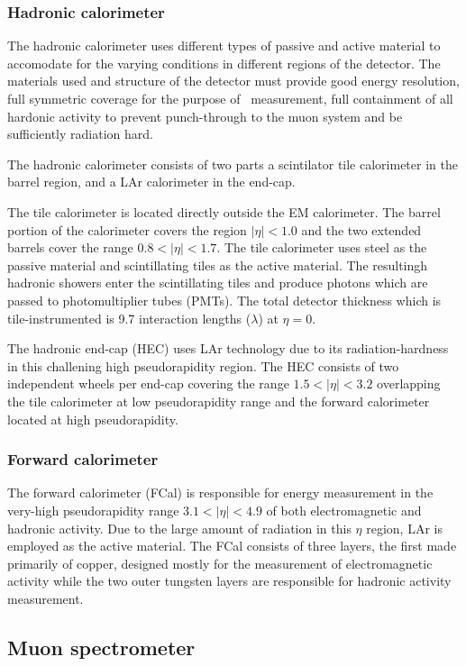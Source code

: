 \subsubsection{Hadronic calorimeter}
The hadronic calorimeter uses different types of passive and active material to accomodate for the varying conditions in different regions of the detector. The materials used and structure of the detector must provide good energy resolution, full symmetric coverage for the purpose of \met\ measurement,  full containment of all hardonic activity to prevent punch-through to the muon system and be sufficiently radiation hard.

The hadronic calorimeter consists of two parts a scintilator tile calorimeter in the barrel region, and a LAr calorimeter in the end-cap.

The tile calorimeter is located directly outside the EM calorimeter. The barrel portion of the calorimeter covers the region $|\eta|<1.0$ and the two extended barrels cover the range $0.8<|\eta|<1.7$. The tile calorimeter uses steel as the passive material and scintillating tiles as the active material. The resultingh hadronic showers enter the scintillating tiles and produce photons which are passed to photomultiplier tubes (PMTs). The total detector thickness which is tile-instrumented is 9.7 interaction lengths ($\lambda$) at $\eta=0$.

The hadronic end-cap (HEC) uses LAr technology due to its radiation-hardness in this challening high pseudorapidity region. The HEC consists of two independent wheels per end-cap covering the range $1.5<|\eta|<3.2$ overlapping the tile calorimeter at low pseudorapidity range and the forward calorimeter located at high pseudorapidity.

\subsubsection{Forward calorimeter}

The forward calorimeter (FCal) is responsible for energy measurement in the very-high pseudorapidity range $3.1<|\eta|<4.9$ of both electromagnetic and hadronic activity. Due to the large amount of radiation in this $\eta$ region, LAr is employed as the active material. The FCal consists of three layers, the first made primarily of copper, designed mostly for the measurement of electromagnetic activity while the two outer tungsten layers are responsible for hadronic activity measurement.

\subsection{Muon spectrometer}

